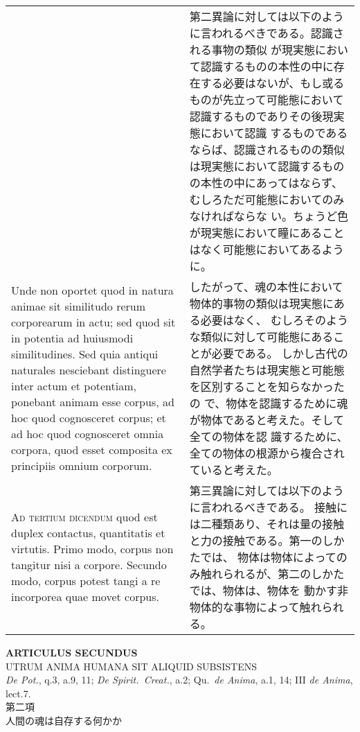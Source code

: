 \documentclass[10pt]{jsarticle} %
\begin{document}
\begin{longtable}{p{21em}p{21em}}
&

第二異論に対しては以下のように言われるべきである。認識される事物の類似
が現実態において認識するものの本性の中に存在する必要はないが、もし或る
ものが先立って可能態において認識するものでありその後現実態において認識
するものであるならば、認識されるものの類似は現実態において認識するもの
の本性の中にあってはならず、むしろただ可能態においてのみなければならな
い。ちょうど色が現実態において瞳にあることはなく可能態においてあるよう
に。

\\

Unde non oportet quod in natura animae sit similitudo rerum
corporearum in actu; sed quod sit in potentia ad huiusmodi
similitudines. Sed quia antiqui naturales nesciebant distinguere inter
actum et potentiam, ponebant animam esse corpus, ad hoc quod
cognosceret corpus; et ad hoc quod cognosceret omnia corpora, quod
esset composita ex principiis omnium corporum.


&

したがって、魂の本性において物体的事物の類似は現実態にある必要はなく、
 むしろそのような類似に対して可能態にあることが必要である。
しかし古代の自然学者たちは現実態と可能態を区別することを知らなかったの
 で、物体を認識するために魂が物体であると考えた。そして全ての物体を認
 識するために、全ての物体の根源から複合されていると考えた。

\\



{\scshape Ad tertium dicendum} quod est duplex contactus, quantitatis et
 virtutis. Primo modo, corpus non tangitur nisi a corpore. Secundo
 modo, corpus potest tangi a re incorporea quae movet corpus.


&

第三異論に対しては以下のように言われるべきである。
接触には二種類あり、それは量の接触と力の接触である。第一のしかたでは、
 物体は物体によってのみ触れられるが、第二のしかたでは、物体は、物体を
 動かす非物体的な事物によって触れられる。



\\




\end{longtable}
\newpage

\begin{center}
{\Large {\bf ARTICULUS SECUNDUS}}\\
{\large UTRUM ANIMA HUMANA SIT ALIQUID SUBSISTENS}\\
{\footnotesize {\itshape De Pot.}, q.3, a.9, 11; {\itshape De
 Spirit.~Creat.}, a.2; Qu.~{\itshape de Anima}, a.1, 14; III {\itshape
 de Anima}, lect.7.}\\
{\Large 第二項\\人間の魂は自存する何かか}
\end{center}
\end{document}
